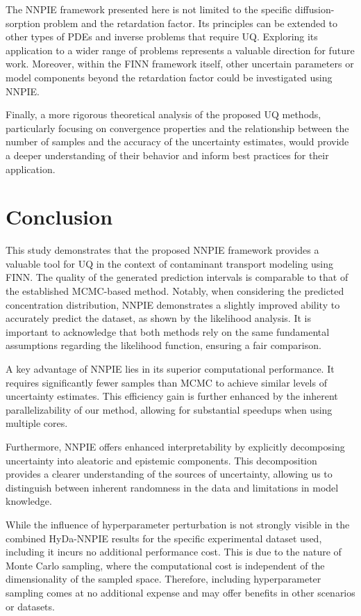 The NNPIE framework presented here is not limited to the specific diffusion-sorption problem and the retardation factor. Its principles can be extended to other types of PDEs and inverse problems that require UQ. Exploring its application to a wider range of problems represents a valuable direction for future work.
Moreover, within the FINN framework itself, other uncertain parameters or model components beyond the retardation factor could be investigated using NNPIE.

Finally, a more rigorous theoretical analysis of the proposed UQ methods, particularly focusing on convergence properties and the relationship between the number of samples and the accuracy of the uncertainty estimates, would provide a deeper understanding of their behavior and inform best practices for their application.



\section{Conclusion}
\label{sec:conclusion}
This study demonstrates that the proposed NNPIE framework provides a valuable tool for UQ in the context of contaminant transport modeling using FINN. The quality of the generated prediction intervals is comparable to that of the established MCMC-based method. Notably, when considering the predicted concentration distribution, NNPIE demonstrates a slightly improved ability to accurately predict the dataset, as shown by the likelihood analysis. It is important to acknowledge that both methods rely on the same fundamental assumptions regarding the likelihood function, ensuring a fair comparison.

A key advantage of NNPIE lies in its superior computational performance. It requires significantly fewer samples than MCMC to achieve similar levels of uncertainty estimates. This efficiency gain is further enhanced by the inherent parallelizability of our method, allowing for substantial speedups when using multiple cores.

Furthermore, NNPIE offers enhanced interpretability by explicitly decomposing uncertainty into aleatoric and epistemic components. This decomposition provides a clearer understanding of the sources of uncertainty, allowing us to distinguish between inherent randomness in the data and limitations in model knowledge.

While the influence of hyperparameter perturbation is not strongly visible in the combined HyDa-NNPIE results for the specific experimental dataset used, including it incurs no additional performance cost. This is due to the nature of Monte Carlo sampling, where the computational cost is independent of the dimensionality of the sampled space. Therefore, including hyperparameter sampling comes at no additional expense and may offer benefits in other scenarios or datasets.




